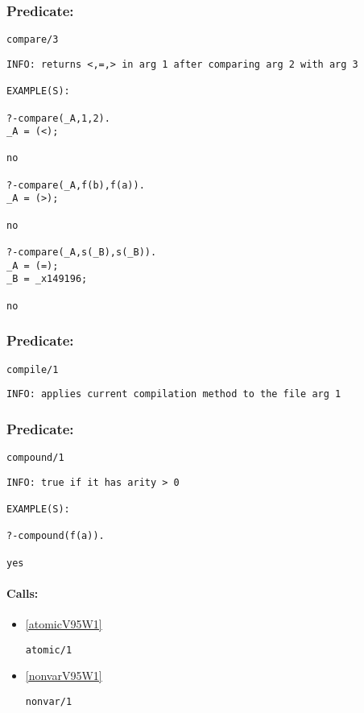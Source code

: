 \subsubsection{Predicate:} \label{compareV95W3}

\begin{verbatim}
compare/3
\end{verbatim}

{\small \begin{verbatim}
INFO: returns <,=,> in arg 1 after comparing arg 2 with arg 3

EXAMPLE(S):

?-compare(_A,1,2).
_A = (<);

no

?-compare(_A,f(b),f(a)).
_A = (>);

no

?-compare(_A,s(_B),s(_B)).
_A = (=);
_B = _x149196;

no

\end{verbatim}}

\subsubsection{Predicate:} \label{compileV95W1}

\begin{verbatim}
compile/1
\end{verbatim}

{\small \begin{verbatim}
INFO: applies current compilation method to the file arg 1

\end{verbatim}}

\subsubsection{Predicate:} \label{compoundV95W1}

\begin{verbatim}
compound/1
\end{verbatim}

{\small \begin{verbatim}
INFO: true if it has arity > 0

EXAMPLE(S):

?-compound(f(a)).

yes

\end{verbatim}}
\paragraph{Calls:} 
\begin{itemize}
\item \ref{atomicV95W1} 
\begin{verbatim}
atomic/1
\end{verbatim}

\item \ref{nonvarV95W1} 
\begin{verbatim}
nonvar/1
\end{verbatim}

\end{itemize}

